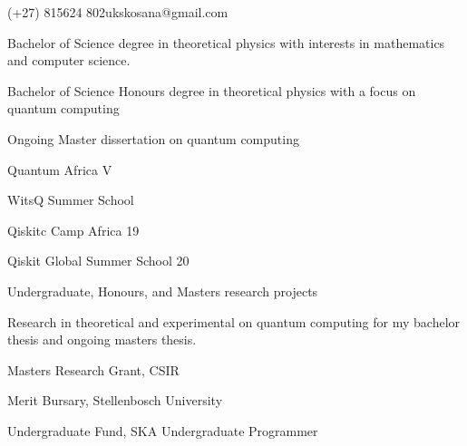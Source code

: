\documentclass{edelgas-resume}
\begin{document}
    \namehead %
    \address{Banghoek Rd \& Bosman St, Stellenbosch, South Africa}{(+27) 815624 802}{ukskosana@gmail.com} %


    \begin{position}{}{}
        \item Bachelor of Science degree in theoretical physics with interests
            in mathematics and computer science.
        \item Bachelor of Science Honours degree in theoretical physics with
            a focus on quantum computing
        \item Ongoing Master dissertation on quantum computing
    \end{position}

    \begin{position}{}{}
        \item Quantum Africa V
        \item WitsQ Summer School 
        \item Qiskitc Camp Africa 19
        \item Qiskit Global Summer School 20
    \end{position}


    \begin{position}{Undergraduate, Honours, and Masters research projects}{} 
        \item Research in theoretical and experimental on quantum computing
            for my bachelor thesis and ongoing masters thesis.
    \end{position}


    \begin{position}{}{}
        \item Masters Research Grant, CSIR
        \item Merit Bursary, Stellenbosch University
        \item Undergraduate Fund, SKA Undergraduate Programmer
    \end{position}
\end{document}

